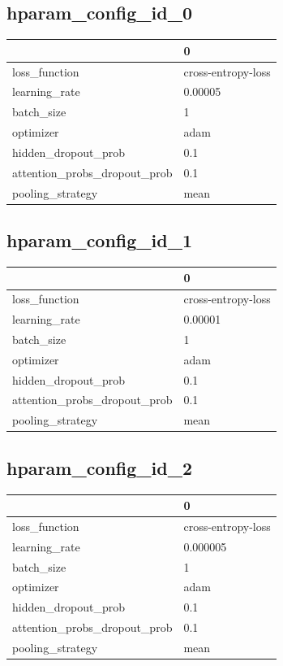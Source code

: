 \documentclass{article}
\begin{document}
\subsection{hparam\_config\_id\_0}
\begin{tabular}{ll}
\toprule
{} &                   0 \\
\midrule
loss\_function                &  cross-entropy-loss \\
learning\_rate                &             0.00005 \\
batch\_size                   &                   1 \\
optimizer                    &                adam \\
hidden\_dropout\_prob          &                 0.1 \\
attention\_probs\_dropout\_prob &                 0.1 \\
pooling\_strategy             &                mean \\
\bottomrule
\end{tabular}

\subsection{hparam\_config\_id\_1}
\begin{tabular}{ll}
\toprule
{} &                   0 \\
\midrule
loss\_function                &  cross-entropy-loss \\
learning\_rate                &             0.00001 \\
batch\_size                   &                   1 \\
optimizer                    &                adam \\
hidden\_dropout\_prob          &                 0.1 \\
attention\_probs\_dropout\_prob &                 0.1 \\
pooling\_strategy             &                mean \\
\bottomrule
\end{tabular}

\subsection{hparam\_config\_id\_2}
\begin{tabular}{ll}
\toprule
{} &                   0 \\
\midrule
loss\_function                &  cross-entropy-loss \\
learning\_rate                &            0.000005 \\
batch\_size                   &                   1 \\
optimizer                    &                adam \\
hidden\_dropout\_prob          &                 0.1 \\
attention\_probs\_dropout\_prob &                 0.1 \\
pooling\_strategy             &                mean \\
\bottomrule
\end{tabular}
\end{document}
